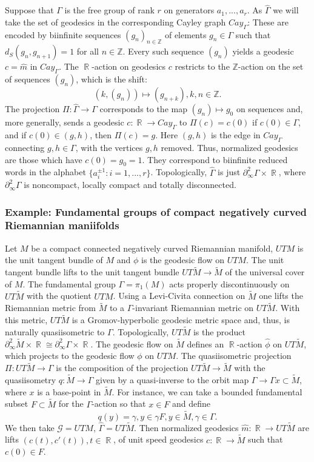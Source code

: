 \documentclass[12pt]{amsbook}%
\theoremstyle{definition}
\theoremstyle{remark}
\numberwithin{section}{chapter}
\numberwithin{subsection}{section}
\numberwithin{figure}{chapter}
\DeclareMathOperator{\R}{\mathbb{R}}
\def\bZ{{\mathbb{Z}}}
\def\Ga{\Gamma}
\def\ga{\gamma}
\def\geo{\partial_\infty}
\def\cG{{\mathscr{G}}}
\begin{document}
Suppose that $\Ga$ is the free group of rank $r$ on generators $a_1,..., a_r$. As $\widehat\Ga$ we will take the set of geodesics in the corresponding Cayley graph $Cay_\Ga$: These are encoded by biinfinite sequences $(g_n)_{n\in \bZ}$ of elements $g_n\in \Ga$ such that $d_S(g_n, g_{n+1})=1$ for all $n\in \bZ$. 
Every such sequence $(g_n)$ yields a geodesic $c=\hat m$ in $Cay_\Ga$. The $\R$-action on geodesics $c$ restricts to the $\bZ$-action on the set of sequences $(g_n)$, which is the shift:
$$
(k, (g_n))\mapsto (g_{n+k}), k, n\in \bZ. 
$$
The projection $\Pi: \widehat \Ga\to \Ga$ corresponds to the map $(g_n)\mapsto g_0$ on sequences and, more generally, sends a geodesic 
$c: \R\to Cay_\Ga$ to $\Pi(c)=c(0)$ if $c(0)\in \Ga$, and if $c(0)\in (g, h)$, then $\Pi(c)=g$. Here $(g, h)$ is the edge in 
$Cay_\Ga$ connecting $g, h\in \Ga$, with the vertices $g, h$ removed. Thus, normalized geodesics are those which have $c(0)=g_0=1$. 
They correspond to biinfinite reduced words in the alphabet $\{a_i^{\pm 1}: i=1,...,r\}$.  Topologically, $\widehat\Ga$ is just 
$\geo^2\Ga\times \R$, where $\geo^2\Ga$ is noncompact, locally compact and totally disconnected. 


\subsubsection{Example: Fundamental groups of compact negatively curved Riemannian maniifolds} 


Let $M$ be a compact connected negatively curved Riemannian manifold, $UTM$ is the unit tangent bundle of $M$ and $\phi$ is the geodesic flow on $UTM$. The unit tangent bundle lifts to the unit tangent bundle $UT\tilde{M}\to \tilde M$ of the universal cover of $M$. The fundamental group $\Ga=\pi_1(M)$  acts properly discontinuously on $UT\tilde{M}$ with the quotient $UTM$. Using a Levi-Civita connection on $\tilde M$ one lifts the Riemannian metric from $\tilde M$ to a $\Ga$-invariant Riemannian metric on $UT\tilde M$. With this metric, $UT\tilde M$ is a Gromov-hyperbolic geodesic metric space and, thus,  
is naturally quasiisometric to $\Gamma$. Topologically, $UT\tilde M$ is the product $\geo^2\tilde M\times \R\cong \geo^2\Ga\times \R$. The geodesic flow 
on $\tilde M$ defines an $\R$-action $\hat\phi$ on  $UT\tilde M$, which projects to the geodesic flow $\phi$ on $UTM$. The quasiisometric projection 
$\Pi: UT\tilde M\to \Ga$ is the composition of the projection  $UT\tilde M\to \tilde M$ with the quasiisometry $q: \tilde M\to \Ga$ given by a quasi-inverse to 
the orbit map $\Ga \to \Ga x\subset \tilde M$, where $x$ is a base-point in $\tilde M$. For instance, we can take a bounded fundamental subset $F\subset \tilde M$ for the $\Ga$-action so that $x\in F$ and define 
$$
q(y)= \ga, y\in \ga F, y\in \tilde M, \ga\in \Ga. 
$$
We then take $\cG=UTM$, $\widehat\Ga=  UT\tilde M$. 
Then normalized geodesics $\hat m: \R\to UT\tilde M$ are lifts $(c(t), c'(t)), t\in \R$, of unit speed geodesics $c: \R\to \tilde M$ such that $c(0)\in F$.  
\end{document}
